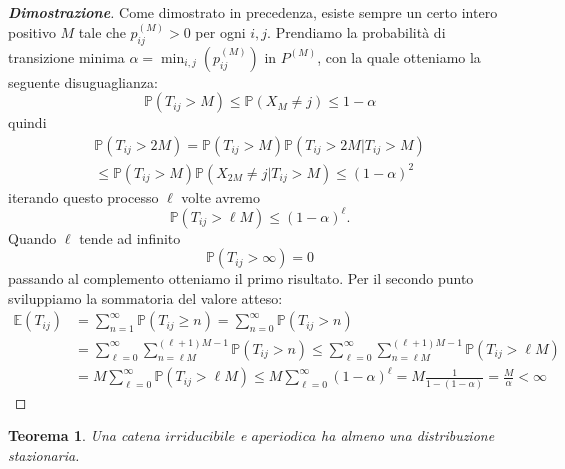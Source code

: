 \documentclass{article}
\newtheorem{theorem}{Teorema}[section]
\theoremstyle{definition}
\theoremstyle{definition}
\theoremstyle{remark}
\begin{document}
\begin{proof}[\textbf{Dimostrazione}]
    Come dimostrato in precedenza, esiste sempre un certo intero positivo $M$ tale che $p_{ij}^{(M)}>0$ per ogni $i,j$. Prendiamo la probabilità di transizione minima $\alpha = \min_{i,j} (p_{ij}^{(M)})$ in $P^{(M)}$, con la quale otteniamo
    la seguente disuguaglianza:
    $$\mathbb{P}(T_{ij}>M)\le \mathbb{P}(X_M \neq j)\le  1-\alpha$$
    quindi
    \begin{align*}
        \mathbb{P}(T_{ij}>2M) = \mathbb{P}(T_{ij}>M)\mathbb{P}(T_{ij}>2M | T_{ij}>M) \\
        \le\mathbb{P}(T_{ij}>M)\mathbb{P}(X_{2M}\neq j| T_{ij}>M)\le (1-\alpha)^2
    \end{align*}
    iterando questo processo $\ell$ volte avremo
    $$\mathbb{P}(T_{ij}>\ell M)\le (1-\alpha)^{\ell}.$$
    Quando $\ell$ tende ad infinito $$\mathbb{P}(T_{ij}>\infty)  = 0$$
    passando al complemento otteniamo il primo risultato. Per il secondo punto sviluppiamo la sommatoria del
    valore atteso:
    \begin{align*}
        \mathbb{E}(T_{ij}) & = \sum_{n=1}^{\infty}\mathbb{P}(T_{ij}\ge n) = \sum_{n=0}^{\infty}\mathbb{P}(T_{ij}> n)                                                                          \\
                           & =\sum_{\ell = 0}^{\infty}\sum_{n = \ell M}^{(\ell+1)M-1}\mathbb{P}(T_{ij}>n)  \le\sum_{\ell = 0}^{\infty}\sum_{n =\ell M}^{(\ell+1)M-1}\mathbb{P}(T_{ij}>\ell M) \\
                           & = M\sum_{\ell = 0}^{\infty} \mathbb{P}(T_{ij}>\ell M) \le M\sum^{\infty}_{\ell = 0} (1-\alpha)^{\ell} = M\frac{1}{1-(1-\alpha)} = \frac{M}{\alpha}<\infty
    \end{align*}
\end{proof}
\begin{theorem}
    Una catena $irriducibile$ e $aperiodica$ ha almeno una distribuzione stazionaria.
\end{theorem}
\end{document}
